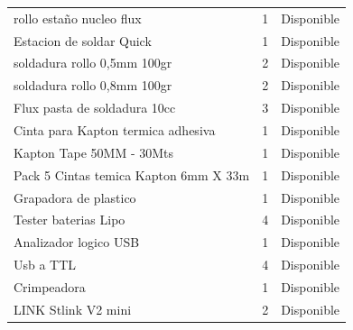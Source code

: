 \begin{longtable}{p{8.5cm} c l}
  rollo estaño nucleo flux & 1 & \cellcolor{verdeOk} Disponible \\
  Estacion de soldar Quick & 1 & \cellcolor{verdeOk} Disponible \\
  soldadura rollo 0,5mm 100gr & 2 & \cellcolor{verdeOk} Disponible \\
  soldadura rollo 0,8mm 100gr & 2 & \cellcolor{verdeOk} Disponible \\
  Flux pasta de soldadura 10cc & 3 & \cellcolor{verdeOk} Disponible \\
  Cinta para Kapton termica adhesiva & 1 & \cellcolor{verdeOk} Disponible \\
  Kapton Tape 50MM - 30Mts & 1 & \cellcolor{verdeOk} Disponible \\
  Pack 5 Cintas temica Kapton 6mm X 33m & 1 & \cellcolor{verdeOk} Disponible \\
  Grapadora de plastico & 1 & \cellcolor{verdeOk} Disponible \\
  Tester baterias Lipo & 4 & \cellcolor{verdeOk} Disponible \\
  Analizador logico USB & 1 & \cellcolor{verdeOk} Disponible \\
  Usb a TTL & 4 & \cellcolor{verdeOk} Disponible \\
  Crimpeadora & 1 & \cellcolor{verdeOk} Disponible \\
  LINK Stlink V2 mini & 2 & \cellcolor{verdeOk} Disponible \\
\end{longtable}
